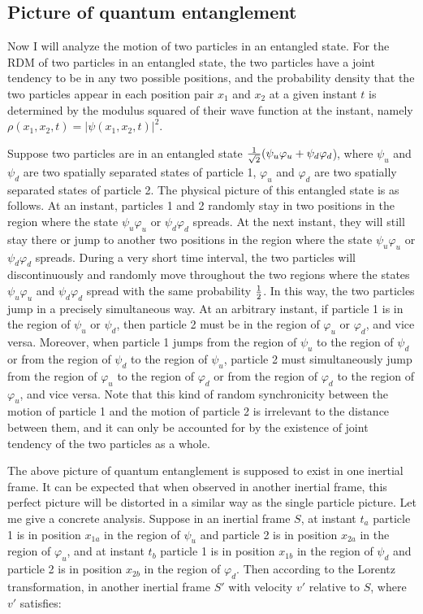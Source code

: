 \subsection{Picture of quantum entanglement}

Now I will analyze the motion of two particles in an entangled state. For the RDM of two particles in an entangled state, the two particles have a joint tendency to be in any two possible positions, and the probability density that the two particles appear in each position pair $x_1$ and $x_2$ at a given instant $t$ is determined by the modulus squared of their wave function at the instant, namely $\rho(x_1,x_2,t)=|\psi(x_1,x_2,t)|^2$.

Suppose two particles are in an entangled state ${1 \over \sqrt{2}}(\psi_u\varphi_u+\psi_d\varphi_d$), where $\psi_u$ and $\psi_d$ are two spatially separated states of particle 1, $\varphi_u$ and $\varphi_d$ are two spatially separated states of particle 2. The physical picture of this entangled state is as follows. At an instant, particles 1 and 2 randomly stay in two positions in the region where the state $\psi_u\varphi_u$ or $\psi_d\varphi_d$ spreads. At the next instant, they will still stay there or jump to another two positions in the region where the state $\psi_u\varphi_u$ or $\psi_d\varphi_d$ spreads.  During a very short time interval, the two particles will discontinuously and randomly move throughout the two regions where the states $\psi_u\varphi_u$ and $\psi_d\varphi_d$ spread with the same probability $1 \over 2$. In this way, the two particles jump in a precisely simultaneous way. At an arbitrary instant, if particle 1 is in the region of $\psi_u$ or $\psi_d$, then particle 2 must be in the region of $\varphi_u$ or $\varphi_d$, and vice versa. Moreover, when particle 1 jumps from the region of $\psi_u$ to the region of $\psi_d$ or from the region of $\psi_d$ to the region of $\psi_u$, particle 2 must simultaneously jump from the region of $\varphi_u$ to the region of $\varphi_d$ or from the region of $\varphi_d$ to the region of $\varphi_u$, and vice versa. Note that this kind of  random synchronicity between the motion of particle 1 and the motion of particle 2 is irrelevant to the distance between them, and it can only be accounted for by the existence of joint tendency of the two particles as a whole.


The above picture of quantum entanglement is supposed to exist in one inertial frame. It can be expected that when observed in another inertial frame, this perfect picture will be distorted in a similar way as the single particle picture. Let me give a concrete analysis. Suppose in an inertial frame $S$, at instant $t_a$ particle 1 is in position $x_{1a}$ in the region of $\psi_u$ and particle 2 is in position $x_{2a}$ in the region of  $\varphi_u$, and at instant $t_b$ particle 1 is in position $x_{1b}$ in the region of $\psi_d$ and particle 2 is in position $x_{2b}$  in the region of $\varphi_d$. Then according to the Lorentz transformation, in another inertial frame $S'$ with velocity $v'$ relative to $S$, where $v'$ satisfies:

